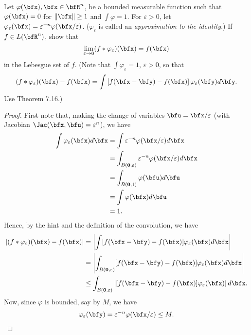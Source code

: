 \begin{problem}
Let $\varphi(\bfx),\bfx\in\bfR^n$, be a bounded measurable function such
that $\varphi(\bfx)=0$ for $\|\bfx\|\geq 1$ and $\int\varphi=1$. For
$\varepsilon>0$, let
$\varphi_\varepsilon(\bfx)=\varepsilon^{-n}\varphi(\bfx/\varepsilon)$. ($\varphi_\varepsilon$
is called an \emph{approximation to the identity}.) If $f\in L(\bfR^n)$,
show that
\[
\lim_{\varepsilon\to 0}(f*\varphi_\varepsilon)(\bfx)=f(\bfx)
\]
in the Lebesgue set of $f$. (Note that $\int\varphi_\varepsilon=1$,
$\varepsilon>0$, so that
\[
(f*\varphi_\varepsilon)(\bfx)-f(\bfx)=\int\left[f(\bfx-\bfy)-f(\bfx)\right]\varphi_\varepsilon(\bfy)d\bfy.
\]
Use Theorem 7.16.)
\end{problem}
\begin{proof}
First note that, making the change of variables $\bfu=\bfx/\varepsilon$
(with Jacobian $\Jac(\bfx,\bfu)=\varepsilon^n$), we
have
\begin{equation}
\label{eq:10:change-of-vars}
\begin{aligned}
\int\varphi_\varepsilon(\bfx)d\bfx
&=\int\varepsilon^{-n}\varphi(\bfx/\varepsilon)d\bfx\\
&=\int_{B(\mathbf{0},\varepsilon)}\varepsilon^{-n}\varphi(\bfx/\varepsilon)d\bfx\\
&=\int_{B(\mathbf{0},1)}\varphi(\bfu)d\bfu\\
&=\int\varphi(\bfx)d\bfu\\
&=1.
\end{aligned}
\end{equation}
Hence, by the hint and the definition of the convolution, we have
\begin{equation}
\label{eq:10:convolution-hint}
\begin{aligned}
\left|(f*\varphi_\varepsilon)(\bfx)-f(\bfx)\right|
&=\left|\int[f(\bfx-\bfy)-f(\bfx)]\varphi_\varepsilon(\bfx)d\bfx\right|\\
&=\left|\int_{B(\mathbf{0},\varepsilon)}[f(\bfx-\bfy)-f(\bfx)]\varphi_\varepsilon(\bfx)d\bfx\right|\\
&\leq\int_{B(\mathbf{0},\varepsilon)}\left|{[f(\bfx-\bfy)-f(\bfx)]\varphi_\varepsilon(\bfx)}\right|d\bfx.
\end{aligned}
\end{equation}
Now, since $\varphi$ is bounded, say by $M$, we have
\begin{align}
\label{eq:10:bound-estimates}
\varphi_\varepsilon(\bfy)=\varepsilon^{-n}\varphi(\bfx/\varepsilon)\leq M.
\end{align}

\end{proof}
